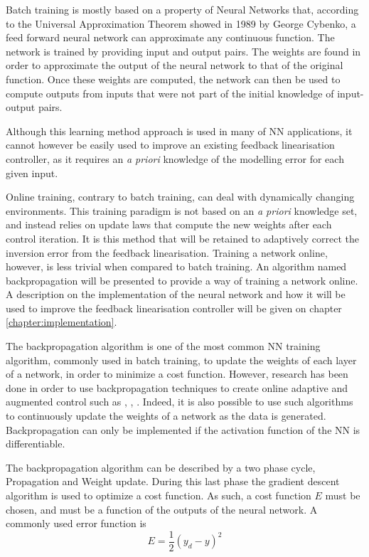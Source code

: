 Batch training is mostly based on a property of Neural Networks that, according to the Universal Approximation Theorem showed in 1989 by George Cybenko, a feed forward neural network can approximate any continuous function. The network is trained by providing input and output pairs. The weights are found in order to approximate the output of the neural network to that of the original function. Once these weights are computed, the network can then be used to compute outputs from inputs that were not part of the initial knowledge of input-output pairs.

Although this learning method approach is used in many of NN applications, it cannot however be easily used to improve an existing feedback linearisation  controller, as it requires an \textit{a priori} knowledge of the modelling error for each given input.

Online training, contrary to batch training, can deal with dynamically changing environments. This training paradigm is not based on an \textit{a priori} knowledge set, and instead relies on update laws that compute the new weights after each control iteration. It is this method that will be retained to adaptively correct the inversion error from the feedback linearisation. Training a network online, however, is less trivial when compared to batch training. An algorithm named backpropagation will be presented to provide a way of training a network online. A description on the implementation of the neural network and how it will be used to improve the feedback linearisation controller will be given on chapter \ref{chapter:implementation}.


The backpropagation algorithm is one of the most common NN training algorithm, commonly used in batch training, to update the weights of each layer of a network, in order to minimize a cost function. However, research has been done in order to use backpropagation techniques to create online adaptive and augmented control such as \cite{online_adaptiveNN}, \cite{UAV_adaptive}, \cite{UAV_adaptive2}. Indeed, it is also possible to use such algorithms to continuously update the weights of a network as the data is generated. Backpropagation can only be implemented if the activation function of the NN is differentiable. 

The backpropagation algorithm can be described by a two phase cycle, Propagation and Weight update. During this last phase the gradient descent algorithm is used to optimize a cost function. As such, a cost function $E$ must be chosen, and must be a function of the outputs of the neural network. A commonly used error function is 
\begin{equation}
E=\frac{1}{2} (y_d-y)^2
\end{equation}

